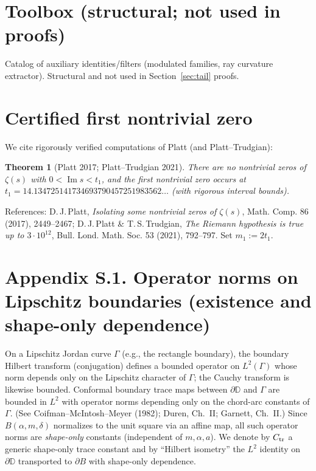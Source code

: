 \documentclass[11pt]{article}
\numberwithin{equation}{section}
\newtheorem{theorem}{Theorem}[section]
\theoremstyle{remark}
\newcommand{\D}{\mathbb{D}}
\DeclareMathOperator{\Imag}{Im}
\begin{document}
\section{Toolbox (structural; not used in proofs)}
Catalog of auxiliary identities/filters (modulated families, ray curvature extractor). Structural and not used in Section~\ref{sec:tail} proofs.

\section{Certified first nontrivial zero}\label{app:firstheight-certified}
We cite rigorously verified computations of Platt (and Platt--Trudgian):
\begin{theorem}[Platt 2017; Platt--Trudgian 2021]
There are no nontrivial zeros of $\zeta(s)$ with $0<\Imag s<t_1$, and the first nontrivial zero occurs at
$t_1=14.134725141734693790457251983562\ldots$ (with rigorous interval bounds).
\end{theorem}
References:
D.\,J.\,Platt, \emph{Isolating some nontrivial zeros of $\zeta(s)$}, Math. Comp. 86 (2017), 2449–2467;
D.\,J.\,Platt \& T.\,S.\,Trudgian, \emph{The Riemann hypothesis is true up to $3\cdot 10^{12}$}, Bull. Lond. Math. Soc. 53 (2021), 792–797.
Set $m_1:=2t_1$.

\section*{Appendix S.1. Operator norms on Lipschitz boundaries (existence and shape-only dependence)}
On a Lipschitz Jordan curve $\Gamma$ (e.g., the rectangle boundary), the boundary Hilbert transform (conjugation) defines a bounded operator on $L^2(\Gamma)$ whose norm depends only on the Lipschitz character of $\Gamma$; the Cauchy transform is likewise bounded. Conformal boundary trace maps between $\partial\D$ and $\Gamma$ are bounded in $L^2$ with operator norms depending only on the chord-arc constants of $\Gamma$. (See Coifman--McIntosh--Meyer (1982); Duren, Ch.~II; Garnett, Ch.~II.)
Since $B(\alpha,m,\delta)$ normalizes to the unit square via an affine map, all such operator norms are \emph{shape-only} constants (independent of $m,\alpha,a$). We denote by $C_{\rm tr}$ a generic shape-only trace constant and by “Hilbert isometry” the $L^2$ identity on $\partial\D$ transported to $\partial B$ with shape-only dependence.
\end{document}
